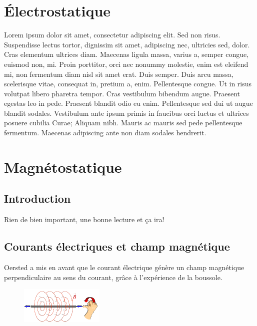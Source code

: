 \documentclass	[11pt, a4paper, openany]{book}
\begin{document}
\chapter{Électrostatique}

Lorem ipsum dolor sit amet, consectetur adipiscing elit. Sed non risus. Suspendisse lectus tortor, dignissim sit amet, adipiscing nec, ultricies sed, dolor. Cras elementum ultrices diam. Maecenas ligula massa, varius a, semper congue, euismod non, mi. Proin porttitor, orci nec nonummy molestie, enim est eleifend mi, non fermentum diam nisl sit amet erat. Duis semper. Duis arcu massa, scelerisque vitae, consequat in, pretium a, enim. Pellentesque congue. Ut in risus volutpat libero pharetra tempor. Cras vestibulum bibendum augue. Praesent egestas leo in pede. Praesent blandit odio eu enim. Pellentesque sed dui ut augue blandit sodales. Vestibulum ante ipsum primis in faucibus orci luctus et ultrices posuere cubilia Curae; Aliquam nibh. Mauris ac mauris sed pede pellentesque fermentum. Maecenas adipiscing ante non diam sodales hendrerit.























\chapter{Magnétostatique}
\section{Introduction}
Rien de bien important, une bonne lecture et ça ira!

\section{Courants électriques et champ magnétique}
Oersted a mis en avant que le courant électrique génère un champ magnétique perpendiculaire au sens du courant, grâce à l'expérience de la boussole.\\

\begin{figure}
\includegraphics[width=4cm]{magneto/image0.png}
\end{figure}
\end{document}
